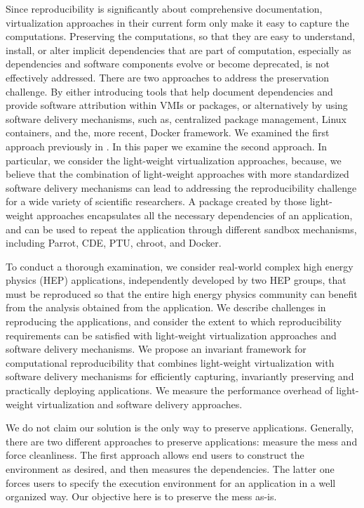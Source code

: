 Since reproducibility is significantly about comprehensive documentation, virtualization approaches in their current form only make it easy to capture the computations. Preserving the computations, so that they are easy to understand, install, or alter implicit dependencies that are part of computation, especially as dependencies and software components evolve or become deprecated, is not effectively addressed. There are two approaches to address the preservation challenge. By either introducing tools that help document dependencies and provide software attribution within VMIs or packages, or alternatively by using software delivery mechanisms, such as, centralized package management, Linux containers, and the, more recent, Docker framework. We examined the first approach previously in \cite{SoftProv}. 
In this paper we examine the second approach. 
In particular, we consider the light-weight virtualization approaches, because, we believe that the combination of light-weight approaches with more standardized software delivery mechanisms can lead to addressing the reproducibility challenge for a wide variety of scientific researchers. 
A package created by those light-weight approaches encapsulates all the necessary dependencies of an application, and can be used to repeat the application through different sandbox mechanisms, including Parrot, CDE, PTU, chroot, and Docker.

To conduct a thorough examination, we consider real-world complex high energy physics (HEP) applications, independently developed by two HEP groups, that must be reproduced so that the entire high energy physics community can benefit from the analysis obtained from the application. We describe challenges in reproducing the applications, and consider the extent to which reproducibility requirements can be satisfied with light-weight virtualization approaches and software delivery mechanisms. We propose an invariant framework for computational reproducibility that combines light-weight virtualization with software delivery mechanisms for efficiently capturing, invariantly preserving and practically deploying applications.
We measure the performance overhead of  light-weight virtualization and software delivery approaches. 

We do not claim our solution is the only way to preserve applications. Generally, there are two different approaches to preserve applications: measure the mess and force cleanliness. The first approach allows end users to construct the environment as desired, and then measures the dependencies. The latter one forces users to specify the execution environment for an application in a well organized way.
Our objective here is to preserve the mess as-is.

